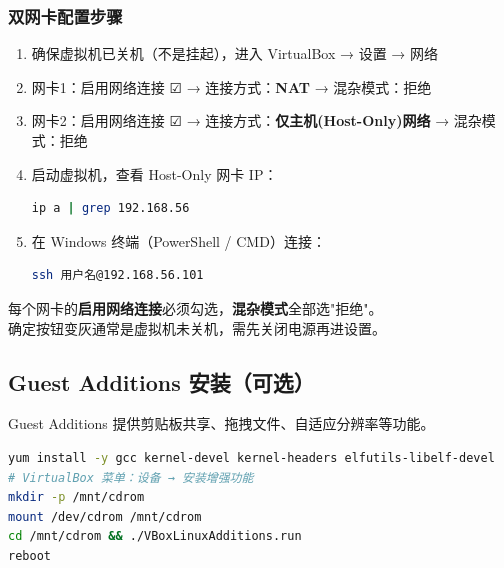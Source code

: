 \documentclass[12pt,a4paper]{ctexart}
\begin{document}
\subsubsection{双网卡配置步骤}

\begin{enumerate}[label=\arabic*.,leftmargin=*]
  \item 确保虚拟机已关机（不是挂起），进入 VirtualBox → 设置 → 网络
  \item 网卡1：启用网络连接 ☑ → 连接方式：\textbf{NAT} → 混杂模式：拒绝
  \item 网卡2：启用网络连接 ☑ → 连接方式：\textbf{仅主机(Host-Only)网络} → 混杂模式：拒绝
  \item 启动虚拟机，查看 Host-Only 网卡 IP：
  \begin{cmdbox}
  \begin{lstlisting}[language=bash,numbers=none]
ip a | grep 192.168.56
  \end{lstlisting}
  \end{cmdbox}
  \item 在 Windows 终端（PowerShell / CMD）连接：
  \begin{cmdbox}
  \begin{lstlisting}[language=bash,numbers=none]
ssh 用户名@192.168.56.101
  \end{lstlisting}
  \end{cmdbox}
\end{enumerate}

\begin{warnbox}
  每个网卡的\textbf{启用网络连接}必须勾选，\textbf{混杂模式}全部选"拒绝"。\\
  确定按钮变灰通常是虚拟机未关机，需先关闭电源再进设置。
\end{warnbox}

\subsection{Guest Additions 安装（可选）}

Guest Additions 提供剪贴板共享、拖拽文件、自适应分辨率等功能。

\begin{cmdbox}
\small
\begin{lstlisting}[language=bash,numbers=none]
yum install -y gcc kernel-devel kernel-headers elfutils-libelf-devel
# VirtualBox 菜单：设备 → 安装增强功能
mkdir -p /mnt/cdrom
mount /dev/cdrom /mnt/cdrom
cd /mnt/cdrom && ./VBoxLinuxAdditions.run
reboot
\end{lstlisting}
\end{cmdbox}
\end{document}
